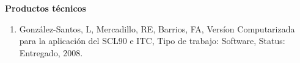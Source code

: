 \textbf{Productos técnicos}

\begin{enumerate}

\item  González-Santos, L, Mercadillo, RE, Barrios, FA, Versíon Computarizada para la aplicación del SCL90 e ITC, Tipo de 
trabajo: Software, Status: Entregado, 2008.

\end{enumerate}


